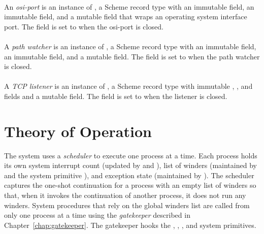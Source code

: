 \paragraph {}
An \emph{osi-port} is an instance of , a Scheme record
type with an immutable  field, an immutable
 field, and a mutable  field that wraps
an operating system interface port. The  field is set to
 when the osi-port is closed.

\paragraph {}
A \emph{path watcher} is an instance of
, a Scheme record type with an immutable
 field, an immutable  field, and a
mutable  field. The  field is set to
 when the path watcher is closed.

\paragraph {}
A \emph{TCP listener} is an instance of
, a Scheme record type with immutable ,
, and  fields and a mutable
 field. The  field is set to  when
the listener is closed.

\section {Theory of Operation}\label{sec:erlang-theory}

The system uses a \emph{scheduler} to execute one
process at a time. Each process holds its own system interrupt count
(updated by  and ),
list of winders (maintained by  and the system
primitive ), and exception state (maintained
by ). The scheduler captures the
one-shot continuation for a process with an empty list of winders so
that, when it invokes the continuation of another process, it does not
run any winders.  \mitigation
System procedures that rely on the global winders list are called from
only one process at a time using the
\emph{gatekeeper} described in
Chapter~\ref{chap:gatekeeper}. The gatekeeper hooks the ,
, , and  system
primitives.

